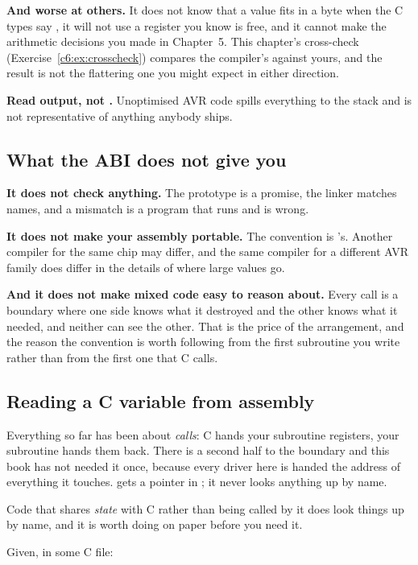 \textbf{And worse at others.} It does not know that a value fits in a byte when the C types say
, it will not use a register you know is free, and it cannot make the arithmetic
decisions you made in Chapter~5. This chapter's cross-check (Exercise~\ref{c6:ex:crosscheck})
compares the compiler's  against yours, and the result is not the flattering one
you might expect in either direction.

\textbf{Read  output, not .} Unoptimised AVR code spills everything to the
stack and is not representative of anything anybody ships.

\subsection{What the ABI does not give you}
\label{c6:sec:abinot}
\textbf{It does not check anything.} The prototype is a promise, the linker matches names, and a
mismatch is a program that runs and is wrong.

\textbf{It does not make your assembly portable.} The convention is 's. Another
compiler for the same chip may differ, and the same compiler for a different AVR family does differ
in the details of where large values go.

\textbf{And it does not make mixed code easy to reason about.} Every call is a boundary where one
side knows what it destroyed and the other knows what it needed, and neither can see the other.
That is the price of the arrangement, and the reason the convention is worth following from the
first subroutine you write rather than from the first one that C calls.

\subsection{Reading a C variable from assembly}
\label{c6:sec:variable}
Everything so far has been about \emph{calls}: C hands your subroutine registers, your subroutine
hands them back. There is a second half to the boundary and this book has not needed it once,
because every driver here is handed the address of everything it touches.  gets a
pointer in ; it never looks anything up by name.

Code that shares \emph{state} with C rather than being called by it does look things up by name,
and it is worth doing on paper before you need it.

Given, in some C file:


